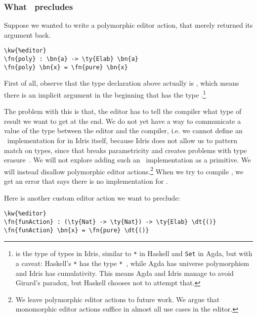 
\subsubsection{What \Editorable\ precludes}\label{ssec:preclude}

Suppose we wanted to write a polymorphic editor action, that merely returned its argument back.

\begin{Verbatim}
\kw{%editor}
\fn{poly} : \bn{a} -> \ty{Elab} \bn{a}
\fn{poly} \bn{x} = \fn{pure} \bn{x}
\end{Verbatim}

First of all, observe that the type declaration above actually is
, which means
there is an implicit argument in the beginning that has the type
.\footnote{ is the type of types in Idris, similar to
\texttt{*} in Haskell and \texttt{Set} in Agda, but with a caveat:
Haskell's \texttt{*} has the type \texttt{*}~\cite{eisenberg}, while Agda has universe
polymorphism and Idris has cumulativity. This means Agda and Idris manage to
avoid Girard's paradox, but Haskell chooses not to attempt that.}

The problem with this is that, the editor has to tell the compiler what type of
result we want to get at the end. We do not yet have a way to communicate a
value of the type  between the editor and the compiler, i.e. we cannot
define an \Editorable\ implementation for  in Idris itself, because
Idris does not allow us to pattern match on types, since that breaks
parametricity and creates problems with type erasure~\cite{powerOfPi, genericDep}.
We will not explore adding such an \Editorable\ implementation as a primitive.
We will instead disallow polymorphic editor actions.\footnote{We leave
polymorphic editor actions to future work. We argue that monomorphic editor
actions suffice in almost all use cases in the editor.}
When we try to compile , we get an error that says there is no  implementation for .

Here is another custom editor action we want to preclude:

\begin{Verbatim}
\kw{%editor}
\fn{funAction} : (\ty{Nat} -> \ty{Nat}) -> \ty{Elab} \dt{()}
\fn{funAction} \bn{x} = \fn{pure} \dt{()}
\end{Verbatim}

